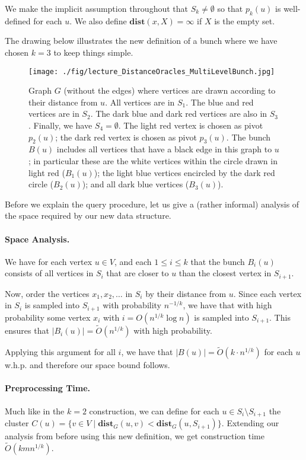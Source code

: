 We make the implicit assumption throughout that $S_k \neq \emptyset$ so that $p_k(u)$ is well-defined for each $u$. We also define $\mathbf{dist}(x,X) = \infty$ if $X$ is the empty set.

The drawing below illustrates the new definition of a bunch where we have chosen $k=3$ to keep things simple.

\begin{figure}[!ht]
    \centering
    \texttt{[image: ./fig/lecture\_DistanceOracles\_MultiLevelBunch.jpg]}
    \caption{Graph $G$ (without the edges) where vertices are drawn according to their distance from $u$. All vertices are in $S_1$. The blue and red vertices are in $S_2$. The dark blue and dark red vertices are also in $S_3$. Finally, we have $S_4 = \emptyset$. 
    The light red vertex is chosen as pivot $p_2(u)$; the dark red vertex is chosen as pivot $p_3(u)$. 
    The bunch $B(u)$ includes all vertices that have a black edge in this graph to $u$; in particular these are the white vertices within the circle drawn in light red ($B_1(u)$); the light blue vertices encircled by the dark red circle ($B_2(u)$); and all dark blue vertices ($B_3(u)$).}
\end{figure}

Before we explain the query procedure, let us give a (rather informal) analysis of the space required by our new data structure.

\paragraph{Space Analysis.} We have for each vertex $u \in V$, and each $1 \leq i \leq k$ that the bunch $B_i(u)$ consists of all vertices in $S_i$ that are closer to $u$ than the closest vertex in $S_{i+1}$. 

Now, order the vertices $x_1, x_2, \dots$ in $S_i$ by their distance from $u$. Since each vertex in $S_i$ is sampled into $S_{i+1}$ with probability $n^{-1/k}$, we have that with high probability some vertex $x_i$ with $i = O(n^{1/k} \log n)$ is sampled into $S_{i+1}$. This ensures that $|B_i(u)| = \tilde{O}(n^{1/k})$ with high probability. 

Applying this argument for all $i$, we have that $|B(u)| = \tilde{O}(k \cdot n^{1/k})$ for each $u$ w.h.p. and therefore our space bound follows.

\paragraph{Preprocessing Time.} Much like in the $k=2$ construction, we can define for each $u \in S_i \setminus S_{i+1}$ the cluster $C(u) = \{ v \in V \;|\; \mathbf{dist}_G(u,v) < \mathbf{dist}_G(u,S_{i+1})\}$. Extending our analysis from before using this new definition, we get construction time $\tilde{O}(kmn^{1/k})$.


